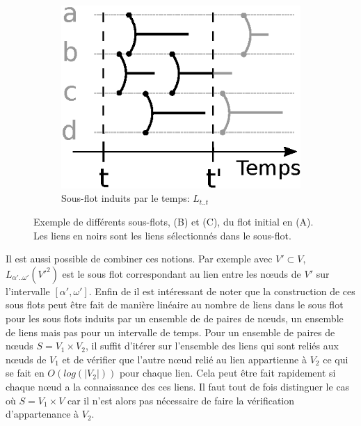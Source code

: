 \begin{figure}[]
	\begin{subfigure}{0.2\linewidth}
		\includegraphics[width=\linewidth]{img/Intro/sous_flots2.eps}\hfill
		\caption{Sous-flot induits par le temps:  $L_{t..t}$}
		\label{fig:exemple_sous_flot2}	
	\end{subfigure}
	\caption{Exemple de différents sous-flots, (B) et (C), du flot initial en (A). Les liens en noirs sont les liens sélectionnés dans le sous-flot. }
\label{fig:exemple_sous_flot}
\end{figure}
Il est aussi possible de combiner ces notions.
Par exemple avec $V' \subset V$, $L_{\alpha'..\omega'}(V'^2)$ est le sous flot correspondant au lien entre les n\oe uds de $V'$ sur l'intervalle $[\alpha', \omega']$.
\bigskip
Enfin de il est intéressant de noter que la construction de ces sous flots peut être fait de manière linéaire au nombre de liens dans le sous flot pour les sous flots induits par un ensemble de de paires de n\oe uds, un ensemble de liens mais pas pour un intervalle de temps.
Pour un ensemble de paires de n\oe uds $S= V_1 \times V_2$, il suffit d'itérer sur l'ensemble des liens qui sont reliés aux n\oe uds de $V_1$ et de vérifier que l'autre n\oe ud relié au lien appartienne à $V_2$ ce qui se fait en $O(log(|V_2|))$ pour chaque lien.
Cela peut être fait rapidement si chaque n\oe ud a la connaissance des ces liens.
Il faut tout de fois distinguer le cas où $S= V_1 \times V$ car il n'est alors pas nécessaire de faire la vérification d'appartenance à $V_2$.

